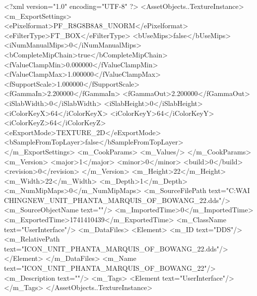 <?xml version="1.0" encoding="UTF-8" ?>
<AssetObjects..TextureInstance>
	<m_ExportSettings>
		<ePixelformat>PF_R8G8B8A8_UNORM</ePixelformat>
		<eFilterType>FT_BOX</eFilterType>
		<bUseMips>false</bUseMips>
		<iNumManualMips>0</iNumManualMips>
		<bCompleteMipChain>true</bCompleteMipChain>
		<fValueClampMin>0.000000</fValueClampMin>
		<fValueClampMax>1.000000</fValueClampMax>
		<fSupportScale>1.000000</fSupportScale>
		<fGammaIn>2.200000</fGammaIn>
		<fGammaOut>2.200000</fGammaOut>
		<iSlabWidth>0</iSlabWidth>
		<iSlabHeight>0</iSlabHeight>
		<iColorKeyX>64</iColorKeyX>
		<iColorKeyY>64</iColorKeyY>
		<iColorKeyZ>64</iColorKeyZ>
		<eExportMode>TEXTURE_2D</eExportMode>
		<bSampleFromTopLayer>false</bSampleFromTopLayer>
	</m_ExportSettings>
	<m_CookParams>
		<m_Values/>
	</m_CookParams>
	<m_Version>
		<major>1</major>
		<minor>0</minor>
		<build>0</build>
		<revision>0</revision>
	</m_Version>
	<m_Height>22</m_Height>
	<m_Width>22</m_Width>
	<m_Depth>1</m_Depth>
	<m_NumMipMaps>0</m_NumMipMaps>
	<m_SourceFilePath text="C:\Users\YANG WAI CHING\Downloads\CIV\DDS NEW\ICON_UNIT_PHANTA_MARQUIS_OF_BOWANG_22.dds"/>
	<m_SourceObjectName text=""/>
	<m_ImportedTime>0</m_ImportedTime>
	<m_ExportedTime>1741410439</m_ExportedTime>
	<m_ClassName text="UserInterface"/>
	<m_DataFiles>
		<Element>
			<m_ID text="DDS"/>
			<m_RelativePath text="ICON_UNIT_PHANTA_MARQUIS_OF_BOWANG_22.dds"/>
		</Element>
	</m_DataFiles>
	<m_Name text="ICON_UNIT_PHANTA_MARQUIS_OF_BOWANG_22"/>
	<m_Description text=""/>
	<m_Tags>
		<Element text="UserInterface"/>
	</m_Tags>
</AssetObjects..TextureInstance>


